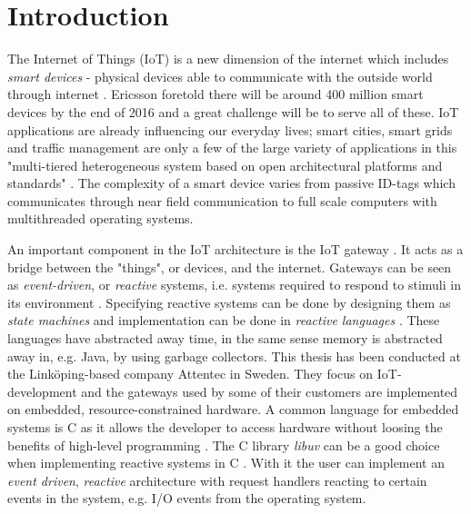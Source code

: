 \chapter{Introduction}
\label{cha:introduction}

The Internet of Things (IoT) is a new dimension of the internet which includes
\textit{smart devices} - physical devices able to communicate with the outside
world through internet
\cite{design-principles-for-distributed-embedded-applications}
\cite{wu2011m2m}. Ericsson foretold there will be around 400 million smart
devices by the end of 2016 \cite{ericsson-iot-forecast} and a great challenge
will be to serve all of these. IoT applications are already influencing our
everyday lives; smart cities, smart grids and traffic management are only a few
of the large variety of applications in this "multi-tiered heterogeneous system
based on open architectural platforms and standards" \cite{gardavsevic2017iot}.
The complexity of a smart device varies from passive ID-tags which communicates
through near field communication to full scale computers with multithreaded
operating systems.

An important component in the IoT architecture is the IoT gateway
\cite{chen2011brief}. It acts as a bridge between the "things", or devices, and
the internet. Gateways can be seen as \textit{event-driven}, or
\textit{reactive} systems, i.e. systems required to respond to stimuli in its
environment \cite{garlan1993introduction} \cite{harel1985development}.
Specifying reactive systems can be done by designing them as \textit{state
machines} and implementation can be done in \textit{reactive languages}
\cite{bainomugisha2013survey}. These languages have abstracted away time, in
the same sense memory is abstracted away in, e.g. Java, by using garbage
collectors. This thesis has been conducted at the Linköping-based company
Attentec in Sweden. They focus on IoT-development and the gateways used by some
of their customers are implemented on embedded, resource-constrained hardware.
A common language for embedded systems is C as it allows the developer to
access hardware without loosing the benefits of high-level programming
\cite{nahas2012choosing} \cite{barr1999programming}. The C library
\textit{libuv} can be a good choice when implementing reactive systems in C
\cite{libuv-webpage}. With it the user can implement an \textit{event driven},
\textit{reactive} architecture with request handlers reacting to certain events
in the system, e.g. I/O events from the operating system.

